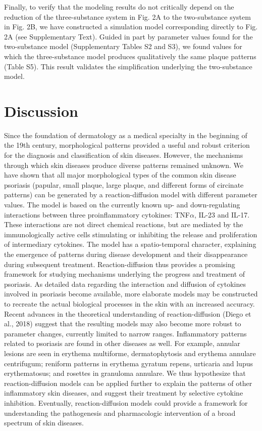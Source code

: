 Finally, to verify that the modeling results do not critically depend on the reduction of the three-substance system in Fig. 2A to the two-substance system in Fig. 2B, we have constructed a simulation model corresponding directly to Fig. 2A (see Supplementary Text). Guided in part by parameter values found for the two-substance model (Supplementary Tables S2 and S3), we found values for which the three-substance model produces qualitatively the same plaque patterns (Table S5). This result validates the simplification underlying the two-substance model.

\section{Discussion}
Since the foundation of dermatology as a medical specialty in the beginning of the 19th century, morphological patterns provided a useful and robust criterion for the diagnosis and classification of skin diseases. However, the mechanisms through which skin diseases produce diverse patterns remained unknown. We have shown that all major morphological types of the common skin disease psoriasis (papular, small plaque, large plaque, and different forms of circinate patterns) can be generated by a reaction-diffusion model with different parameter values. The model is based on the currently known up- and down-regulating interactions between three proinflammatory cytokines: TNF$\alpha$, IL-23 and IL-17. These interactions are not direct chemical reactions, but are mediated by the immunologically active cells stimulating or inhibiting the release and proliferation of intermediary cytokines. The model has a spatio-temporal character, explaining the emergence of patterns during disease development and their disappearance during subsequent treatment. Reaction-diffusion thus provides a promising framework for studying mechanisms underlying the progress and treatment of psoriasis. As detailed data regarding the interaction and diffusion of cytokines involved in psoriasis become available, more elaborate models may be constructed to recreate the actual biological processes in the skin with an increased accuracy. Recent advances in the theoretical understanding of reaction-diffusion (Diego et al., 2018) suggest that the resulting models may also become more robust to parameter changes, currently limited to narrow ranges. Inflammatory patterns related to psoriasis are found in other diseases as well. For example, annular lesions are seen in erythema multiforme, dermatophytosis and erythema annulare centrifugum; reniform patterns in erythema gyratum repens, urticaria and lupus erythematosus; and rosettes in granuloma annulare. We thus hypothesize that reaction-diffusion models can be applied further to explain the patterns of other inflammatory skin diseases, and suggest their treatment by selective cytokine inhibition. Eventually, reaction-diffusion models could provide a framework for understanding the pathogenesis and pharmacologic intervention of a broad spectrum of skin diseases. 

